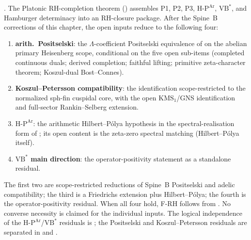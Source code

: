 \begin{remark}
\label{v4-arith:w3-audit-B:thm:four-input-spine}
\ClaimStatusConjectured. The Platonic RH-completion theorem
() assembles P1, P2, P3,
\(\mathrm{H}\text{-}\mathrm{P}^{\mathrm{Ar}}\),
\(\mathrm{VB}^{*}\), and Hamburger determinacy into an RH-closure
package. After the Spine~B corrections of this chapter, the open
inputs reduce to the following four:
\begin{enumerate}
\item \textbf{arith.~Positselski}: the \(\Lambda\)-coefficient
Positselski equivalence of
 on the abelian primary
Heisenberg scope, conditional on the five open sub-items
(completed continuous duals; derived completion; faithful lifting;
primitive zeta-character theorem; Koszul-dual Bost--Connes).
\item \textbf{Koszul--Petersson compatibility}: the identification
 scope-restricted to the normalized
sph-fin cuspidal core, with the open \(\mathrm{KMS}_{1}\)/GNS
identification and full-sector Rankin--Selberg extension.
\item \textbf{\(\mathrm{H}\text{-}\mathrm{P}^{\mathrm{Ar}}\)}: the
arithmetic Hilbert--P\'olya hypothesis in the spectral-realisation
form of ; its open
content is the zeta-zero spectral matching (Hilbert--P\'olya itself).
\item \textbf{\(\mathrm{VB}^{*}\) main direction}: the
operator-positivity statement
 as a standalone residual.
\end{enumerate}
The first two are scope-restricted reductions of Spine~B Positselski
and adelic compatibility; the third is a Friedrichs extension plus
Hilbert--P\'olya; the fourth is the operator-positivity residual.
When all four hold, F-RH follows from
. No converse necessity is
claimed for the individual inputs. The logical independence of the
\(\mathrm{H}\text{-}\mathrm{P}^{\mathrm{Ar}}\)/\(\mathrm{VB}^{*}\)
residuals is ;
the Positselski and Koszul--Petersson residuals are separated in
 and
.
\end{remark}


